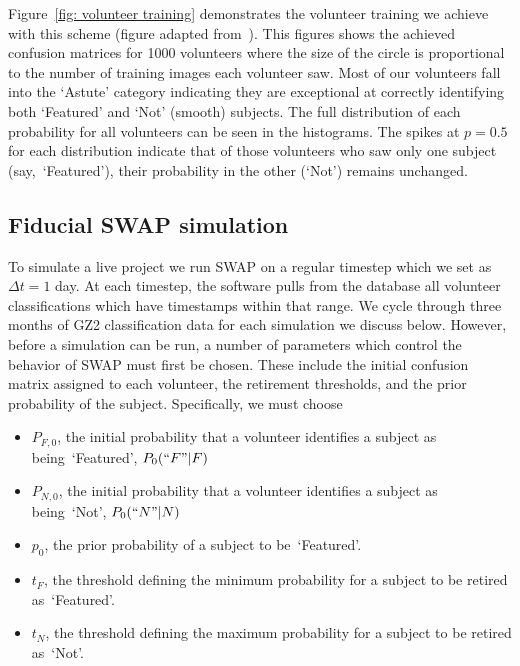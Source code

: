 \documentclass[twocolumn]{aastex6}
\newcommand{\Pf}{$P_{F,0}$}
\newcommand{\Pn}{$P_{N,0}$}
\newcommand{\p}{$p_0$}
\newcommand{\tf}{$t_F$}
\newcommand{\tn}{$t_N$}
\newcommand{\feat}{`Featured'}
\newcommand{\notfeat}{`Not'}
\begin{document}
Figure~\ref{fig: volunteer training} demonstrates the volunteer training we achieve
with this scheme (figure adapted from~\cite{Marshall2016}). 
This figures shows the achieved confusion matrices for 1000 volunteers
where the size of the circle is proportional to the number of training images each
volunteer saw. Most of our volunteers fall into the `Astute' category indicating
they are exceptional at correctly identifying both `Featured' and `Not' (smooth) subjects. 
The full distribution of each probability for all volunteers can be seen in the 
histograms. The spikes at $p=0.5$ for each distribution indicate that of those
volunteers who saw only one subject (say,~\feat), their probability in the 
other (\notfeat) remains unchanged.


\subsection{Fiducial SWAP simulation}\label{sec: fiducial}

To simulate a live project we run SWAP on a regular timestep which we set as $\Delta t = 1$ day. 
At each timestep, the software pulls from the database all volunteer classifications which
have timestamps within that range. We cycle through three months of GZ2 classification data 
for each simulation we discuss below. However, before a simulation can be run, a number 
of parameters which control the behavior of SWAP must first be chosen. These include
 the initial confusion matrix assigned to each volunteer, the retirement
thresholds, and the prior probability of the subject. Specifically, we must choose 
\begin{itemize}
\item \Pf, the initial probability that a volunteer identifies a subject as being~\feat, $P_0(``F"|F)$
\item \Pn, the initial probability that a volunteer identifies a subject as being~\notfeat, $P_0(``N"|N)$
\item \p, the prior probability of a subject to be~\feat.
\item \tf, the threshold defining the minimum probability for a subject to be retired as~\feat.
\item \tn, the threshold defining the maximum probability for a subject to be retired as~\notfeat.
\end{itemize}
\end{document}
